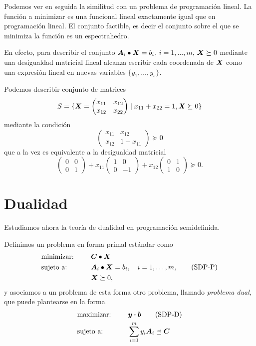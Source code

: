 Podemos ver en seguida la similitud con un problema de programación lineal.
La función a minimizar es una funcional lineal exactamente igual que en programación lineal. El conjunto factible, es decir el conjunto sobre el que se minimiza la función es un espectrahedro.

En efecto, para describir el conjunto $\bm{A}_i \bullet \bm{X} = b_i$, $i = 1, \dots, m$, $\bm{X} \succeq 0$ mediante una desigualdad matricial lineal alcanza escribir cada coordenada de $\bm{X}$ como una expresión lineal en nuevas variables $\{y_1, \dots, y_s\}$.

\begin{example}
Podemos describir conjunto de matrices
$$
S = \{\bm{X} = \begin{pmatrix}
x_{11} & x_{12} \\
x_{12} & x_{22}
\end{pmatrix} \mid x_{11} + x_{22} = 1, \bm{X} \succeq 0\}
$$
mediante la condición
$$
\begin{pmatrix}
x_{11} & x_{12} \\
x_{12} & 1 - x_{11}
\end{pmatrix}  \succeq 0
$$
que a la vez es equivalente a la desigualdad matricial
$$
\begin{pmatrix}
0 & 0 \\
0 & 1
\end{pmatrix}  +
x_{11}
\begin{pmatrix}
1 & 0 \\
0 & - 1
\end{pmatrix}  +
x_{12}
\begin{pmatrix}
0 & 1 \\
1 & 0
\end{pmatrix}\succeq 0.
$$
\end{example}


\section{Dualidad}
Estudiamos ahora la teoría de dualidad en programación semidefinida.

Definimos un problema en forma primal estándar como 
\begin{alignat}{2}
  & \text{minimizar: } & \quad & \bm{C} \bullet \bm{X} \nonumber \\
  & \text{sujeto a: }  \quad & & \bm{A}_i \bullet \bm{X} = b_i, \quad i = 1, \dots, m, \tag{SDP-P}\label{sdp-p}\\
   && & \bm{X} \succeq 0, \nonumber
\end{alignat}
y asociamos a un problema de esta forma otro problema, llamado \emph{problema dual}, que puede plantearse en la forma
\begin{alignat}{2}
  & \text{maximizar: } &   \quad & \bm{y} \boldsymbol{\cdot} \bm{b} \tag{SDP-D}\label{sdp-d} \\
  & \text{sujeto a: } & \quad & \sum_{i=1}^m y_i  \bm{A}_i \preceq \bm{C} \nonumber 
\end{alignat}

